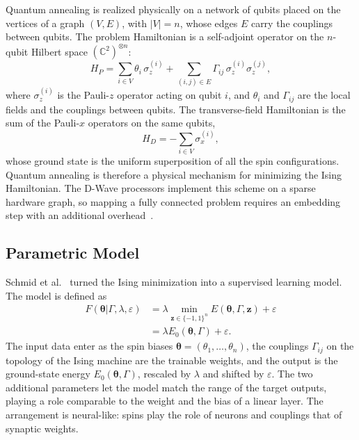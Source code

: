 \documentclass{ieeeaccess}
\begin{document}
Quantum annealing is realized physically on a network of qubits placed on the
vertices of a graph $(V, E)$, with $|V| = n$, whose edges $E$ carry the
couplings between qubits. The problem Hamiltonian is a self-adjoint operator
on the $n$-qubit Hilbert space $\left(\mathbb{C}^2\right)^{\otimes n}$:
\begin{equation}
H_P = \sum_{i \in V} \theta_i \, \sigma_z^{(i)} + \sum_{(i,j) \in E} \Gamma_{ij} \, \sigma_z^{(i)} \sigma_z^{(j)},
\label{hamiltonian}
\end{equation}
where $\sigma_z^{(i)}$ is the Pauli-$z$ operator acting on qubit $i$, and
$\theta_i$ and $\Gamma_{ij}$ are the local fields and the couplings between
qubits. The transverse-field Hamiltonian is the sum of the Pauli-$x$
operators on the same qubits,
\begin{equation}
H_D = - \sum_{i \in V} \sigma_x^{(i)},
\label{eq:driver}
\end{equation}
whose ground state is the uniform superposition of all the spin
configurations. Quantum annealing is therefore a physical mechanism for minimizing
the Ising Hamiltonian. The D-Wave processors implement this scheme on a sparse
hardware graph, so mapping a fully connected problem requires an embedding
step with an additional overhead~\cite{DWaveOcean}.

\subsection{Parametric Model}\label{sec:parametric}
Schmid et al.~\cite{10.21468/SciPostPhysCore.7.1.013} turned the Ising
minimization into a supervised learning model. The model is defined as
\begin{align}
F(\boldsymbol{\theta}|\Gamma, \lambda, \varepsilon) &= \lambda \min_{\mathbf{z} \in \{-1,1\}^n} E(\boldsymbol{\theta}, \Gamma, \mathbf{z}) + \varepsilon \\
&= \lambda E_0(\boldsymbol{\theta}, \Gamma) + \varepsilon.
\label{model}
\end{align}
The input data enter as the spin biases $\boldsymbol{\theta} = (\theta_1, \ldots, \theta_n)$,
the couplings $\Gamma_{ij}$ on the topology of the Ising machine are the
trainable weights, and the output is the ground-state energy
$E_0(\boldsymbol{\theta}, \Gamma)$, rescaled by $\lambda$ and shifted by
$\varepsilon$. The two additional parameters let the model match the range of
the target outputs, playing a role comparable to the weight and the bias of a
linear layer. The arrangement is neural-like: spins play the
role of neurons and couplings that of synaptic weights.
\end{document}
